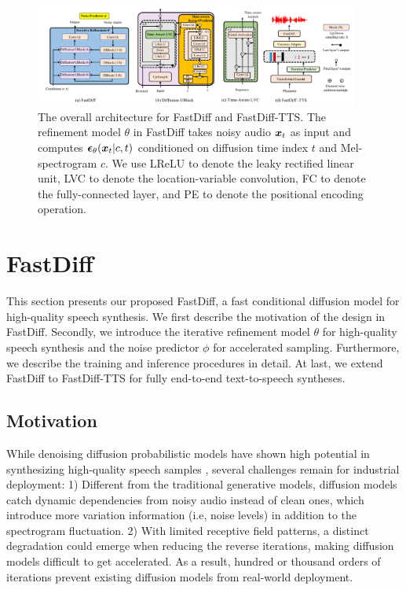 \begin{figure}
    \vspace{-2mm}
    \centering
    \includegraphics[width=0.95\textwidth,trim={1.0cm 0cm 1.0cm 0cm}]{Figures/arch1.pdf}
    \vspace{-1mm}
   \caption{The overall architecture for FastDiff and FastDiff-TTS. The refinement model $\theta$ in FastDiff takes noisy audio ${\bm{x}}_{t}$ as input and computes $\boldsymbol\epsilon_{\theta}({\bm{x}}_{t}|c, t)$ conditioned on diffusion time index $t$ and Mel-spectrogram $c$. We use LReLU to denote the leaky rectified linear unit, LVC to denote the location-variable convolution, FC to denote the fully-connected layer, and PE to denote the positional encoding operation.} 
    \label{fig:arch}
  \end{figure}


\section{FastDiff}
This section presents our proposed FastDiff, a fast conditional diffusion model for high-quality speech synthesis. We first describe the motivation of the design in FastDiff. Secondly, we introduce the iterative refinement model $\theta$ for high-quality speech synthesis and the noise predictor $\phi$ for accelerated sampling. Furthermore, we describe the training and inference procedures in detail. At last, we extend FastDiff to FastDiff-TTS for fully end-to-end text-to-speech syntheses.

\subsection{Motivation}
While denoising diffusion probabilistic models have shown high potential in synthesizing high-quality speech samples \cite{chen2020wavegrad,kong2020diffwave,liu2021diffsinger}, several challenges remain for industrial deployment: 1) Different from the traditional generative models, diffusion models catch dynamic dependencies from noisy audio instead of clean ones, which introduce more variation information (i.e, noise levels) in addition to the spectrogram fluctuation. 2) With limited receptive field patterns, a distinct degradation could emerge when reducing the reverse iterations, making diffusion models difficult to get accelerated. As a result, hundred or thousand orders of iterations prevent existing diffusion models from real-world deployment.

